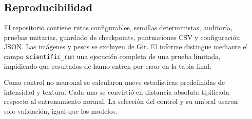 \subsection{Reproducibilidad}

El repositorio contiene rutas configurables, semillas deterministas, auditoría,
pruebas unitarias, guardado de checkpoints, puntuaciones CSV y configuración
JSON. Las imágenes y pesos se excluyen de Git. El informe distingue mediante el
campo \texttt{scientific\_run} una ejecución completa de una prueba limitada,
impidiendo que resultados de humo entren por error en la tabla final.

Como control no neuronal se calcularon nueve estadísticas predefinidas de
intensidad y textura. Cada una se convirtió en distancia absoluta tipificada
respecto al entrenamiento normal. La selección del control y su umbral usaron
solo validación, igual que los modelos.
